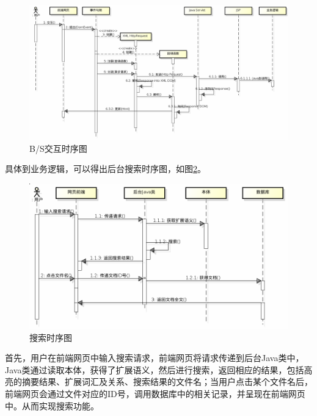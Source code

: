\documentclass[12pt,a4paper]{article}
\begin{document}
	\begin{figure}[htbp] 
	\centering\includegraphics[width=5in]{fig/Sequence.png} 
	\caption{B/S交互时序图}\label{fig:B/S交互时序图}
	\end{figure} 
	
	具体到业务逻辑，可以得出后台搜索时序图，如图\ref{fig:搜索时序图}。
	
	\begin{figure}[htbp] 
	\centering\includegraphics[width=5in]{fig/SearchSequence.png} 
	\caption{搜索时序图}\label{fig:搜索时序图} 
	\end{figure}
	
	首先，用户在前端网页中输入搜索请求，前端网页将请求传递到后台Java类中，Java类通过读取本体，获得了扩展语义，然后进行搜索，返回相应的结果，包括高亮的摘要结果、扩展词汇及关系、搜索结果的文件名；当用户点击某个文件名后，前端网页会通过文件对应的ID号，调用数据库中的相关记录，并呈现在前端网页中。从而实现搜索功能。
		
\end{document}
